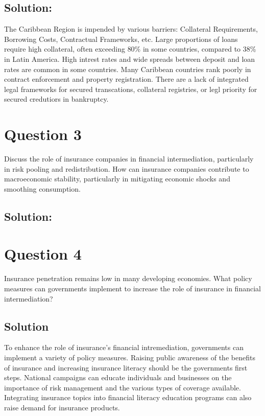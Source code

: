 \subsection*{Solution: }

The Caribbean Region is impended by various barriers: Collateral Requirements, Borrowing Costs, Contractual Frameworks, etc. Large proportions of loans require high collateral, often exceeding 80\% in some countries, compared to 38\% in Latin America. High intrest rates 
and wide spreads between deposit and loan rates are common in some countries. Many Caribbean countries rank poorly in contract enforcement and property registration. There are a lack of integrated legal frameworks for secured transcations, collateral registries, or legl priority for secured credutiors in bankruptcy. 


\section*{Question 3}

Discuss the role of insurance companies in financial intermediation, particularly in
risk pooling and redistribution. How can insurance companies contribute to
macroeconomic stability, particularly in mitigating economic shocks and
smoothing consumption.

\subsection*{Solution: }


\section*{Question 4}

Insurance penetration remains low in many developing economies. What policy
measures can governments implement to increase the role of insurance in financial
intermediation?

\subsection*{Solution}

To enhance the role of insurance's financial intremediation, governments can implement a variety of 
policy measures. Raising public awareness of the benefits of insurance and increasing insurance literacy should be the governments first 
steps. National campaigns can educate individuals and businesses on the importance of risk management and the various types of coverage available. 
Integrating insurance topics into financial literacy education programs can also raise demand for insurance products. 


